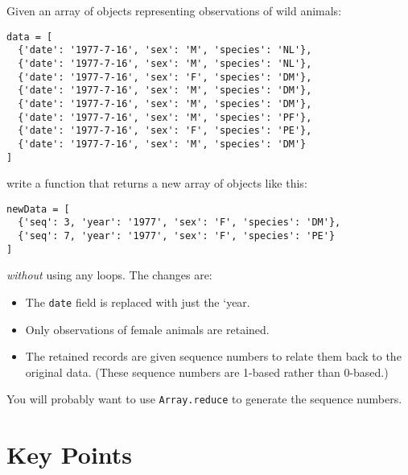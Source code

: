 Given an array of objects representing observations of wild animals:

\begin{verbatim}
data = [
  {'date': '1977-7-16', 'sex': 'M', 'species': 'NL'},
  {'date': '1977-7-16', 'sex': 'M', 'species': 'NL'},
  {'date': '1977-7-16', 'sex': 'F', 'species': 'DM'},
  {'date': '1977-7-16', 'sex': 'M', 'species': 'DM'},
  {'date': '1977-7-16', 'sex': 'M', 'species': 'DM'},
  {'date': '1977-7-16', 'sex': 'M', 'species': 'PF'},
  {'date': '1977-7-16', 'sex': 'F', 'species': 'PE'},
  {'date': '1977-7-16', 'sex': 'M', 'species': 'DM'}
]
\end{verbatim}

\noindent
write a function that returns a new array of objects like this:

\begin{verbatim}
newData = [
  {'seq': 3, 'year': '1977', 'sex': 'F', 'species': 'DM'},
  {'seq': 7, 'year': '1977', 'sex': 'F', 'species': 'PE'}
]
\end{verbatim}

\emph{without} using any loops.
The changes are:

\begin{itemize}
\item
  The \texttt{date} field is replaced with just the `year.
\item
  Only observations of female animals are retained.
\item
  The retained records are given sequence numbers to relate them back to the original data.
  (These sequence numbers are 1-based rather than 0-based.)
\end{itemize}

You will probably want to use \texttt{Array.reduce} to generate the sequence numbers.

\section*{Key Points}


